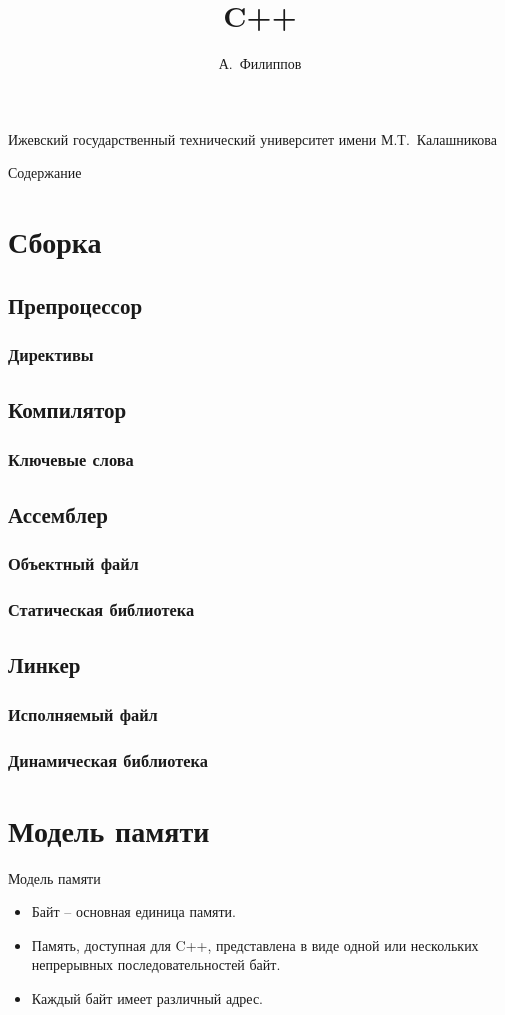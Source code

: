 \documentclass[xetex,mathserif,serif,10pt]{beamer}
\begin{document}
    \title[C++]{C++}
    \author[Филиппов]{А.~Филиппов}
    \institute
    {
        Ижевский государственный технический университет имени М.Т.~Калашникова
    }
    \frame{\titlepage}
    \begin{frame}{Содержание}
        \tableofcontents
    \end{frame}
    \section{Сборка}
    \subsection{Препроцессор}
    \subsubsection{Директивы}
    \subsection{Компилятор}
    \subsubsection{Ключевые слова}
    \subsection{Ассемблер}
    \subsubsection{Объектный файл}
    \subsubsection{Статическая библиотека}
    \subsection{Линкер}
    \subsubsection{Исполняемый файл}
    \subsubsection{Динамическая библиотека}
    \section{Модель памяти}
    \begin{frame}{Модель памяти}
        \begin{itemize}
            \item Байт -- основная единица памяти.
            \item Память, доступная для C++, представлена в виде одной или нескольких непрерывных последовательностей байт.
            \item Каждый байт имеет различный адрес.
        \end{itemize}
    \end{frame}
\end{document}

